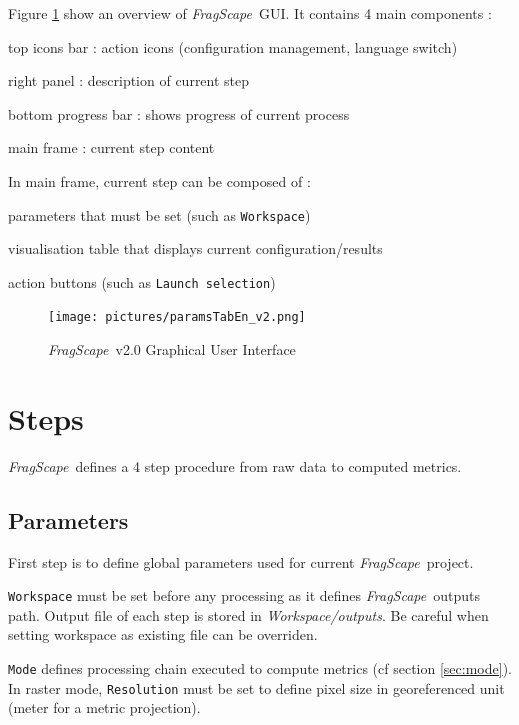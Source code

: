 \documentclass[11pt]{article}
\newcommand{\source}[1]{\vspace*{-0.4cm}\caption*{\textit{Source: {#1}}}}
\newcommand{\tool}{\emph{FragScape}}
\let\tempone\itemize
\let\temptwo\enditemize
\renewenvironment{itemize}{\tempone\addtolength{\itemsep}{-0.5\baselineskip}}{\temptwo}
\begin{document}
Figure \ref{fig:paramsTab} show an overview of \tool\ GUI. It contains 4 main components :
\begin{itemize}
    \item top icons bar : action icons (configuration management, language switch)
    \item right panel : description of current step
    \item bottom progress bar : shows progress of current process
    \item main frame : current step content
\end{itemize}

In main frame, current step can be composed of :
\begin{itemize}
    \item parameters that must be set (such as \texttt{Workspace})
    \item visualisation table that displays current configuration/results
    \item action buttons (such as \texttt{Launch selection})
\end{itemize}

\begin{figure}[h!]
    \centering
    \texttt{[image: pictures/paramsTabEn\_v2.png]}
    \caption{\tool\ v2.0 Graphical User Interface}
    \label{fig:paramsTab}
\end{figure}

\pagebreak

\section{Steps}
\label{sec:steps}

\tool\ defines a 4 step procedure from raw data to computed metrics.

\subsection{Parameters}

First step is to define global parameters used for current \tool\ project.

\texttt{Workspace} must be set before any processing as it defines \tool\ outputs path. Output file of each step is stored in \textit{Workspace/outputs}. Be careful when setting workspace as existing file can be overriden.

\texttt{Mode} defines processing chain executed to compute metrics (cf section \ref{sec:mode}). In raster mode, \texttt{Resolution} must be set to define pixel size in georeferenced unit (meter for a metric projection).
\end{document}
